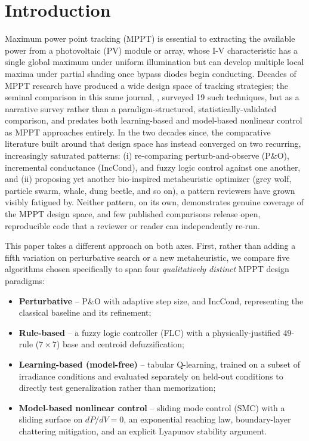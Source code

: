 \section{Introduction}
\label{sec:introduction}

Maximum power point tracking (MPPT) is essential to extracting the
available power from a photovoltaic (PV) module or array, whose I-V
characteristic has a single global maximum under uniform illumination but
can develop multiple local maxima under partial shading once bypass diodes
begin conducting. Decades of MPPT research have produced a wide design
space of tracking strategies; the seminal comparison in this same journal,
\cite{esram2007comparison}, surveyed 19 such techniques, but as a narrative
survey rather than a paradigm-structured, statistically-validated
comparison, and predates both learning-based and model-based nonlinear
control as MPPT approaches entirely. In the two decades since, the
comparative literature built around that design space has instead
converged on two recurring, increasingly saturated
patterns: (i) re-comparing perturb-and-observe (P\&O), incremental
conductance (IncCond), and fuzzy logic control against one another, and
(ii) proposing yet another bio-inspired metaheuristic optimizer (grey wolf,
particle swarm, whale, dung beetle, and so on), a pattern reviewers have
grown visibly fatigued by. Neither pattern, on its own, demonstrates
genuine coverage of the MPPT design space, and few published comparisons
release open, reproducible code that a reviewer or reader can independently
re-run.

This paper takes a different approach on both axes. First, rather than
adding a fifth variation on perturbative search or a new metaheuristic, we
compare five algorithms chosen specifically to span four \emph{qualitatively
distinct} MPPT design paradigms:
\begin{itemize}
  \item \textbf{Perturbative} -- P\&O with adaptive step size, and
    IncCond, representing the classical baseline and its refinement;
  \item \textbf{Rule-based} -- a fuzzy logic controller (FLC) with a
    physically-justified 49-rule ($7\times7$) base and centroid
    defuzzification;
  \item \textbf{Learning-based (model-free)} -- tabular Q-learning, trained
    on a subset of irradiance conditions and evaluated separately on
    held-out conditions to directly test generalization rather than
    memorization;
  \item \textbf{Model-based nonlinear control} -- sliding mode control
    (SMC) with a sliding surface on $dP/dV=0$, an exponential reaching law,
    boundary-layer chattering mitigation, and an explicit Lyapunov
    stability argument.
\end{itemize}

